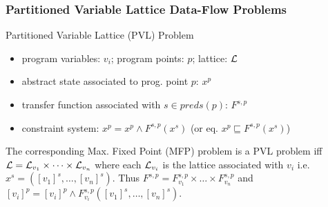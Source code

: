 \begin{frame}
\frametitle{Partitioned Variable Lattice Data-Flow Problems}
\begin{exampleblock}{Partitioned Variable Lattice (PVL) Problem}
\begin{itemize}
\item program variables: $v_i$; program points: $p$; lattice: $\cal L$\\
\item abstract state associated to prog. point $p$: $x^p$\\
\item transfer function associated with $s\in \textit{preds}(p)$: $F^{s,p}$\\
\item constraint system: $x^p = x^p \wedge F^{s,p}(x^s)$ (or eq. $x^p \sqsubseteq  F^{s,p}(x^s)$)\\
\end{itemize}
The corresponding Max. Fixed Point (MFP) problem is a PVL problem iff ${\cal L}={\cal L}_{v_1}\times \dots \times {\cal L}_{v_n}$ where each ${\cal L}_{v_i}$ is the lattice associated with $v_i$ i.e. $x^s=([v_1]^s,\dots,[v_n]^s)$. Thus $F^{s,p}=F^{s,p}_{v_1}\times \dots\times F^{s,p}_{v_n}$ and $[v_i]^p = [v_i]^p \wedge  F^{s,p}_{v_i}([v_1]^s,\dots,[v_n]^s)$.
\end{exampleblock}
\end{frame}

